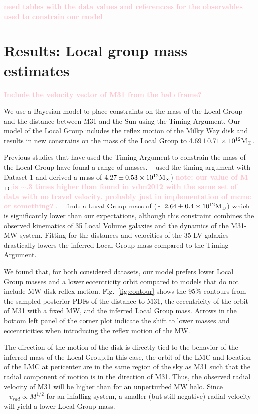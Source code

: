 \documentclass[twocolumn]{aastex631}
\newcommand{\mlg}{M$_{\rm LG}$}
\newcommand{\kc}[1]{\textcolor{pink}{\textbf{#1}} }
\begin{document}
\kc{need tables with the data values and referencces for the observables used to constrain our model}

\section{Results: Local group mass estimates}
\label{sec:results}
\kc{Include the velocity vector of M31 from the halo frame?}

We use a Bayesian model to place constraints on the mass of the Local Group and the distance between M31 and the Sun using the Timing Argument. Our model of the Local Group includes the reflex motion of the Milky Way disk and results in new constrains on the mass of the Local Group to 4.69$\pm0.71 \times 10^{12}\mathrm{M}_\odot$. 

Previous studies that have used the Timing Argument to constrain the mass of the Local Group have found a range of masses. ~\cite{vdm2012} used the timing argument with Dataset 1 and derived a mass of $4.27\pm 0.53\times 10^{12}\mathrm{M}_\odot$) \kc{note: our value of \mlg is $\sim$.3 times higher than found in vdm2012 with the same set of data with no travel velocity. probably just in implementation of mcmc or something?}. 
~\cite{Penarrubia2016} finds a Local Group mass of ($\sim2.64\pm0.4\times 10^{12}\mathrm{M}_\odot$) which is significantly lower than our expectations, although this constraint combines the observed kinematics of 35 Local Volume galaxies and the dynamics of the M31-MW system. Fitting for the distances and velocities of the 35 LV galaxies drastically lowers the inferred Local Group mass compared to the Timing Argument. 


We found that, for both considered datasets, our model prefers lower Local Group masses and a lower eccentricity orbit compared to models that do not include MW disk reflex motion. Fig.~\ref{fig:contour} shows the 95\% contours from the sampled posterior PDFs of the distance to M31, the eccentricity of the orbit of M31 with a fixed MW, and the inferred Local Group mass. Arrows in the bottom left panel of the corner plot indicate the shift to lower masses and eccentricities when introducing the reflex motion of the MW. 

The direction of the motion of the disk is directly tied to the behavior of the inferred mass of the Local Group.In this case, the orbit of the LMC and location of the LMC at pericenter are in the same region of the sky as M31 such that the radial component of motion is in the direction of M31. Thus, the observed radial velocity of M31 will be higher than for an unperturbed MW halo. Since $-v_{rad}\propto M^{1/2}$ for an infalling system, a smaller (but still negative) radial velocity will yield a lower Local Group mass. 
\end{document}
